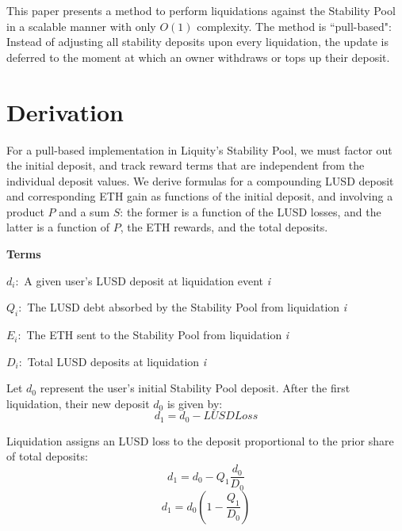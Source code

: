 \documentclass[reqno]{article}
\begin{document}
This paper presents a method to perform liquidations against the Stability Pool in a scalable manner with only $O(1)$ complexity. The method is ``pull-based": Instead of adjusting all stability deposits upon every liquidation, the update is deferred to the moment at which an owner withdraws or tops up their deposit.

\section{Derivation}
For a pull-based implementation in Liquity’s Stability Pool, we must factor out the initial deposit, and track reward terms that are independent from the individual deposit values. We derive formulas for a compounding LUSD deposit and corresponding ETH gain as functions of the initial deposit, and involving a product $P$ and a sum $S$: the former is a function of the LUSD losses, and the latter is a function of $P$, the ETH rewards, and the total deposits.

\pagebreak
\bigskip
\raggedright %

\textbf{Terms}
\begin{terms}
    \item $d_i:$ A given user’s LUSD deposit at liquidation event \textit{i}\\
    \item $Q_i:$ The LUSD debt absorbed by the Stability Pool from liquidation \textit{i}\\
    \item $E_i:$ The ETH sent to the Stability Pool from liquidation \textit{i}\\
    \item $D_i:$ Total LUSD deposits at liquidation \textit{i}
\end{terms}

\bigskip
Let $d_0$ represent the user’s initial Stability Pool deposit. After the first liquidation, their new
deposit $d_0$ is given by:\\
\begin{equation} 
    d_1=d_0-LUSDLoss
\end{equation}

\bigskip
Liquidation assigns an LUSD loss to the deposit proportional to the prior share of total deposits:
\begin{equation} \label{eq:2}
    d_1=d_0-Q_1\frac{d_0}{D_0}
\end{equation}
\begin{equation} 
    d_1=d_0\left(1-\frac{Q_1}{D_0}\right)
\end{equation}
\end{document}
